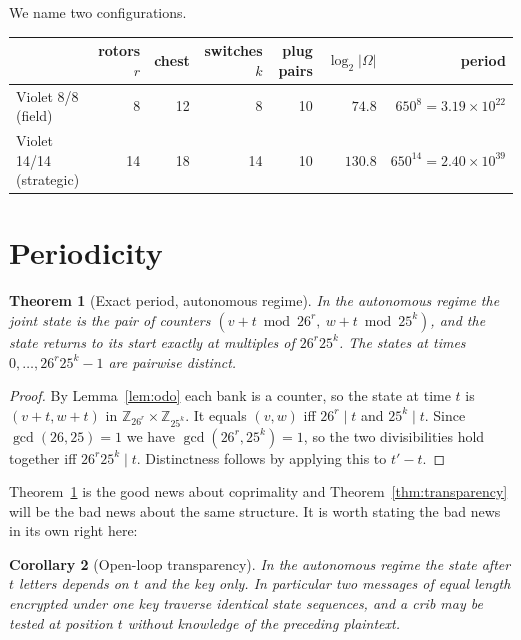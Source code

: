 \documentclass[11pt]{article}
\newtheorem{theorem}{Theorem}
\newtheorem{corollary}[theorem]{Corollary}
\theoremstyle{definition}
\newcommand{\ZZ}{\mathbb{Z}}
\newcommand{\Om}{\Omega}
\begin{document}
We name two configurations.

\begin{center}
\small
\begin{tabular}{lrrrrrr}
\toprule
& rotors $r$ & chest & switches $k$ & plug pairs & $\log_2|\Om|$ & period \\
\midrule
Violet 8/8 (field)      & 8  & 12 & 8  & 10 & $74.8$  & $650^{8} = 3.19\times10^{22}$\\
Violet 14/14 (strategic)& 14 & 18 & 14 & 10 & $130.8$ & $650^{14} = 2.40\times10^{39}$\\
\bottomrule
\end{tabular}
\end{center}

\section{Periodicity}\label{sec:period}

\begin{theorem}[Exact period, autonomous regime]\label{thm:period}
In the autonomous regime the joint state is the pair of counters
$(v + t \bmod 26^{r},\ w + t \bmod 25^{k})$, and the state returns to its start
exactly at multiples of $26^{r}25^{k}$. The states at times $0,\dots,26^{r}25^{k}-1$
are pairwise distinct.
\end{theorem}

\begin{proof}
By Lemma~\ref{lem:odo} each bank is a counter, so the state at time $t$ is
$(v+t, w+t)$ in $\ZZ_{26^r}\times\ZZ_{25^k}$. It equals $(v,w)$ iff $26^{r}\mid t$
and $25^{k}\mid t$. Since $\gcd(26,25)=1$ we have $\gcd(26^{r},25^{k}) = 1$, so
the two divisibilities hold together iff $26^{r}25^{k}\mid t$. Distinctness
follows by applying this to $t'-t$.
\end{proof}

Theorem~\ref{thm:period} is the good news about coprimality and
Theorem~\ref{thm:transparency} will be the bad news about the same structure. It
is worth stating the bad news in its own right here:

\begin{corollary}[Open-loop transparency]\label{cor:transparent}
In the autonomous regime the state after $t$ letters depends on $t$ and the key
only. In particular two messages of equal length encrypted under one key
traverse identical state sequences, and a crib may be tested at position $t$
without knowledge of the preceding plaintext.
\end{corollary}
\end{document}
